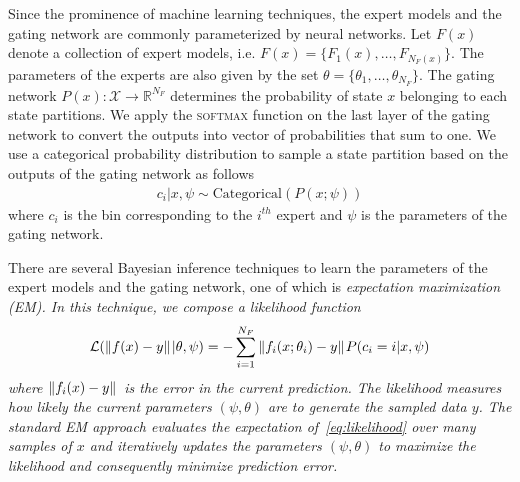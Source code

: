 Since the prominence of machine learning techniques, the expert models and the
gating network are commonly parameterized by neural networks.
%
Let $F(x)$ denote a collection of expert models, i.e. $F(x) = \{F_1(x), \dots,
F_{N_{F}(x)}\}$.
%
The parameters of the experts are also given by the set $\theta=\{\theta_1, \dots,
\theta_{N_{F}} \}$.
%
%
The gating network $P(x) : \mathcal{X} \rightarrow \mathbb{R}^{N_F}$ determines 
the probability of state $x$ belonging to each state partitions. 
%
We apply the \textsc{softmax} function on the last layer of the gating network
to convert the outputs into vector of probabilities that sum to one.
%
We use a categorical probability distribution to sample a state partition based
on the outputs of the gating network as follows~\cite{harkonen2022mixtures} 
\begin{align}
  c_i | x, \psi \sim \text{Categorical}(P(x; \psi)) 
  \label{eq:gating_categorical}
\end{align}
\noindent where $c_i$ is the bin corresponding to the $i^{th}$ expert and $\psi$
is the parameters of the gating network.
%

There are several Bayesian inference techniques to learn the parameters of the
expert models and the gating network, one of which is \it{expectation
maximization} \normalfont (EM).
%
In this technique, we compose a likelihood function   
\begin{equation}
  \mathcal{L}(\|{f(x)-y}\|_{{}_{}} | \theta, \psi) = -\sum_{i=1}^{N_F} \|{f_i(x; \theta_i)-y}\|_{{}_{}} P(c_i = i | x, \psi)
  \label{eq:likelihood}
\end{equation}
\noindent where $\|{f_i(x) - y}\|_{{}_{}}$ is the error in the current prediction.
%
The likelihood measures how likely the current parameters $(\psi, \theta)$ are
to generate the sampled data $y$. 
%
%
The standard EM approach evaluates the expectation of~\eqref{eq:likelihood} over
many samples of $x$ and iteratively updates the parameters $(\psi, \theta)$ to
maximize the likelihood and consequently minimize prediction error.
%